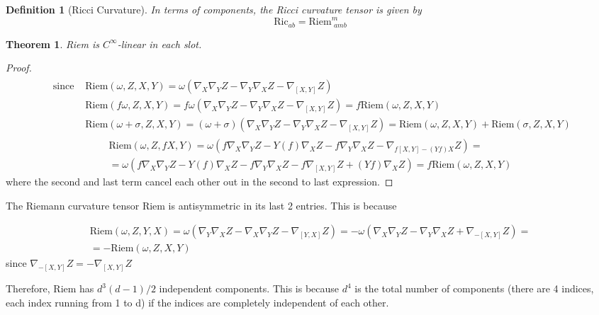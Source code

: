 \documentclass[10pt]{amsart}
\newtheorem{theorem}{Theorem}
\newtheorem{definition}{Definition}
\begin{document}
\begin{multicols*}{2}
\begin{definition}[Ricci Curvature]
In terms of components, the Ricci curvature tensor is given by
\begin{equation}
	\text{Ric}_{ab} = \text{Riem}^m_{\, \, amb}
\end{equation}
\end{definition}

\begin{theorem}
	Riem is $C^{\infty}$-linear in each slot.
\end{theorem}

\begin{proof}
\[
\begin{gathered}
	\begin{aligned}
		\text{ since } & \text{Riem}(\omega, Z, X, Y) = \omega (\nabla_X \nabla_Y Z - \nabla_Y \nabla_X Z - \nabla_{[X,Y]} Z) \\
		& \text{Riem}(f\omega, Z, X, Y) = f\omega (\nabla_X \nabla_Y Z - \nabla_Y \nabla_X Z - \nabla_{[X,Y]} Z) = f\text{Riem}(\omega, Z, X, Y) \\
		& \text{Riem}(\omega + \sigma, Z, X, Y) = (\omega + \sigma) (\nabla_X \nabla_Y Z - \nabla_Y \nabla_X Z - \nabla_{[X,Y]} Z) = \text{Riem}(\omega, Z, X, Y) + \text{Riem}(\sigma, Z, X, Y) 
	\end{aligned} 
\end{gathered}\]
\[
\begin{gathered}
	\text{Riem}(\omega, Z, fX, Y) = \omega (f\nabla_X \nabla_Y Z - Y(f) \nabla_X Z - f\nabla_Y \nabla_X Z -  \nabla_{f[X,Y] - (Yf)X} Z ) = \\
	= \omega (f\nabla_X \nabla_Y Z - Y(f) \nabla_X Z - f\nabla_Y \nabla_X Z - f \nabla_{[X, Y]}Z + (Yf)\nabla_X Z) = f\text{Riem}(\omega, Z, X, Y) 
\end{gathered}\]
where the second and last term cancel each other out in the second to last expression.

\end{proof}

The Riemann curvature tensor Riem is antisymmetric in its last 2 entries. This is because

\[
\begin{gathered}
	\text{Riem}(\omega, Z, Y, X) = \omega(\nabla_Y \nabla_X Z - \nabla_X \nabla_Y Z - \nabla_{[Y,X]} Z) = -\omega(\nabla_X \nabla_Y Z - \nabla_Y \nabla_X Z + \nabla_{-[X,Y]} Z ) = \\
	= -\text{Riem}(\omega, Z, X, Y)
\end{gathered}
\]
since $\nabla_{-[X,Y]}Z = -\nabla_{[X,Y]}Z$

Therefore, Riem has $d^3 (d-1)/2$ independent components. This is because $d^4$ is the total number of components (there are 4 indices, each index running from 1 to d) if the indices are completely independent of each other. 


\end{multicols*}
\end{document}

